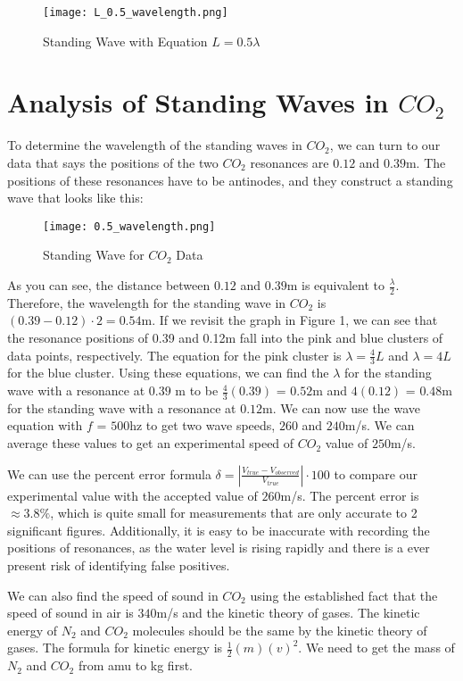 \documentclass[11pt,twoside]{article}
\begin{document}
\begin{figure}[H]
    \centering
    \texttt{[image: L\_0.5\_wavelength.png]}
    \caption{Standing Wave with Equation $L = 0.5\lambda$}
\end{figure}

\section{Analysis of Standing Waves in $CO_2$}

To determine the wavelength of the standing waves in $CO_2$, we can turn to our data that says the positions of the two $CO_2$ resonances are $0.12$ and $0.39$m. The positions of these resonances have to be antinodes, and they construct a standing wave that looks like this:

\begin{figure}[H]
    \centering
    \texttt{[image: 0.5\_wavelength.png]}
    \caption{Standing Wave for $CO_2$ Data}
\end{figure}

As you can see, the distance between $0.12$ and $0.39$m is equivalent to $\frac{\lambda}{2}$. Therefore, the wavelength for the standing wave in $CO_2$ is $(0.39 - 0.12) \cdot 2 = 0.54$m. If we revisit the graph in Figure 1, we can see that the resonance positions of 0.39 and 0.12m fall into the pink and blue clusters of data points, respectively. The equation for the pink cluster is $\lambda = \frac{4}{3}L$ and $\lambda = 4L$ for the blue cluster. Using these equations, we can find the $\lambda$ for the standing wave with a resonance at $0.39$ m to be $\frac{4}{3}(0.39)$ = $0.52$m and $4(0.12)$ = $0.48$m for the standing wave with a resonance at $0.12$m. We can now use the wave equation with $f$ = $500$hz to get two wave speeds, $260$ and $240$m/s. We can average these values to get an experimental speed of $CO_2$ value of $250$m/s. 

We can use the percent error formula 
$\delta = |\frac{V_{true} - V_{observed}}{V_{true}}| \cdot 100$ to compare our experimental value with the accepted value of $260$m/s. The percent error is $\approx 3.8\%$, which is quite small for measurements that are only accurate to 2 significant figures. Additionally, it is easy to be inaccurate with recording the positions of resonances, as the water level is rising rapidly and there is a ever present risk of identifying false positives. 

We can also find the speed of sound in $CO_2$ using the established fact that the speed of sound in air is $340$m/s and the kinetic theory of gases. The kinetic energy of $N_2$ and $CO_2$ molecules should be the same by the kinetic theory of gases. The formula for kinetic energy is $\frac{1}{2}(m)(v)^2$. We need to get the mass of $N_2$ and $CO_2$ from amu to kg first. 
\end{document}
